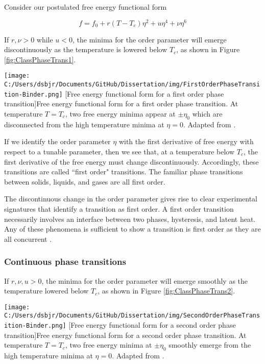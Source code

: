 Consider our postulated free energy functional form

\begin{equation}
f = f_{0} + r(T-T_{c}) \eta^{2} + u \eta^{4} + \nu \eta^{6}
\end{equation}

If $r,\nu > 0$ while $u < 0$, the minima for the order parameter will emerge discontinuously as the temperature is lowered below $T_{c}$, as shown in Figure \ref{fig:ClassPhaseTrans1}.

\begin{centering}
\texttt{[image: C:/Users/dsbjr/Documents/GitHub/Dissertation/img/FirstOrderPhaseTransition-Binder.png]}
  \captionsetup{width=0.9\textwidth}
  [Free energy functional form for a first order phase transition]{Free energy functional form for a first order phase transition. At temperature  $T = T_{c}$, two free energy minima appear at $\pm \eta_{0}$ which are disconnected from the high temperature minima at $\eta = 0$.  Adapted from \cite{Binder1987}.}
  \label{fig:ClassPhaseTrans1}
\end{centering}

If we identify the order parameter $\eta$ with the first derivative of free energy with respect to a tunable parameter, then we see that, at a temperature below $T_{c}$, the first derivative of the free energy must change discontinuously. Accordingly, these transitions are called ``first order" transitions. The familiar phase transitions between solids, liquids, and gases are all first order. 

The discontinuous change in the order parameter gives rise to clear experimental signatures that identify a transition as first order. A first order transition necessarily involves an interface between two phases, hysteresis, and latent heat. Any of these phenomena is sufficient to show a transition is first order as they are all concurrent \cite{Mnyukh2011}.

\subsubsection{Continuous phase transitions}

If $r,\nu,u > 0$, the minima for the order parameter will emerge smoothly as the temperature lowered below $T_{c}$, as shown in Figure \ref{fig:ClassPhaseTrans2}.

\begin{centering}
\texttt{[image: C:/Users/dsbjr/Documents/GitHub/Dissertation/img/SecondOrderPhaseTransition-Binder.png]}
  \captionsetup{width=0.9\textwidth}
  [Free energy functional form for a second order phase transition]{Free energy functional form for a second order phase transition. At temperature  $T = T_{c}$, two free energy minima at $\pm \eta_{0}$ smoothly emerge from the high temperature minima at $\eta = 0$.  Adapted from \cite{Binder1987}.}
  \label{fig:ClassPhaseTrans2}
\end{centering}



